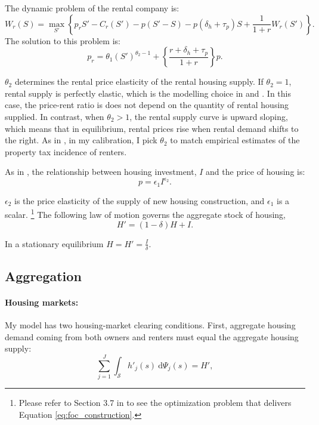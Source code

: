 \documentclass[parskip=full]{article}
\begin{document}
The dynamic problem of the rental company is:
\begin{equation*}
W_r(S)=\max_{S'} \left\{p_{r}S' - C_r(S') - p (S'-S) - p(\delta_{h}+\tau_{p})S + \frac{1}{1+r}W_r(S')\right\}.
\end{equation*}
The solution to this problem is:
\begin{equation}
\label{eq:foc_rental}
p_{r} = \theta_1 (S')^{\theta_2-1}+\left\{\frac{r+\delta_{h}+\tau_p}{1+r}\right\}p.
\end{equation}

\noindent $\theta_2$ determines the rental price elasticity of the rental housing supply. If $\theta_2=1$, rental supply is perfectly elastic, which is the modelling choice in \citet{gervais} and \citet{kaplanetal-2019}. In this case, the price-rent ratio is does not depend on the quantity of rental housing supplied. In contrast, when $\theta_{2}>1$, the rental supply curve is upward sloping, which means that in equilibrium, rental prices rise when rental demand shifts to the right. As in \citet{rs-2023}, in my calibration, I pick $\theta_2$ to match empirical estimates of the property tax incidence of renters.

As in \citet{az-2024}, the relationship between housing investment, $I$ and the price of housing is:
\begin{equation}
\label{eq:foc_construction}
p = \epsilon_1 I^{\epsilon_2}.
\end{equation}

\noindent $\epsilon_2$ is the price elasticity of the supply of new housing construction, and $\epsilon_1$ is a scalar. \footnote{Please refer to Section 3.7 in \citet{rs-2023} to see the optimization problem that delivers Equation \eqref{eq:foc_construction}.} The following law of motion governs the aggregate stock of housing,
\begin{equation}\label{eq:lom_h}
H' = (1-\delta)H + I.
\end{equation}

\noindent In a stationary equilibrium $H=H'=\frac{I}{\delta}$.

\subsection{Aggregation}\label{subsection:aggregation}

\paragraph{Housing markets:} My model has two housing-market clearing conditions. First, aggregate housing demand coming from both owners and renters must equal the aggregate housing supply:
\begin{equation}
    \label{eq:mkt_h}
    \sum_{j=1}^J \int_{\mathcal{S}} h'_j(s)\ \mathrm{d}\Psi_j(s) = H',
\end{equation}
\end{document}
